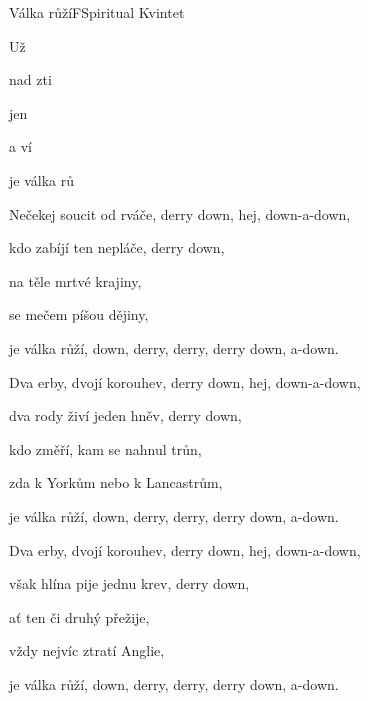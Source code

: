 \begin{song}{Válka růží}{F}{Spiritual Kvintet}
\begin{SBVerse}
Už  

nad zti 

jen 

a ví

je válka rů 
\end{SBVerse}
\begin{SBVerse}
Nečekej soucit od rváče, derry down, hej, down-a-down,

kdo zabíjí ten nepláče, derry down,

na těle mrtvé krajiny,

se mečem píšou dějiny,

je válka růží, down, derry, derry, derry down, a-down.
\end{SBVerse}
\begin{SBVerse}
Dva erby, dvojí korouhev, derry down, hej, down-a-down,

dva rody živí jeden hněv, derry down,

kdo změří, kam se nahnul trůn, 

zda k Yorkům nebo k Lancastrům,

je válka růží, down, derry, derry, derry down, a-down.
\end{SBVerse}
\begin{SBVerse}
Dva erby, dvojí korouhev, derry down, hej, down-a-down,

však hlína pije jednu krev, derry down,

ať ten či druhý přežije, 

vždy nejvíc ztratí Anglie,

je válka růží, down, derry, derry, derry down, a-down.
\end{SBVerse}
\end{song}

\pagebreak